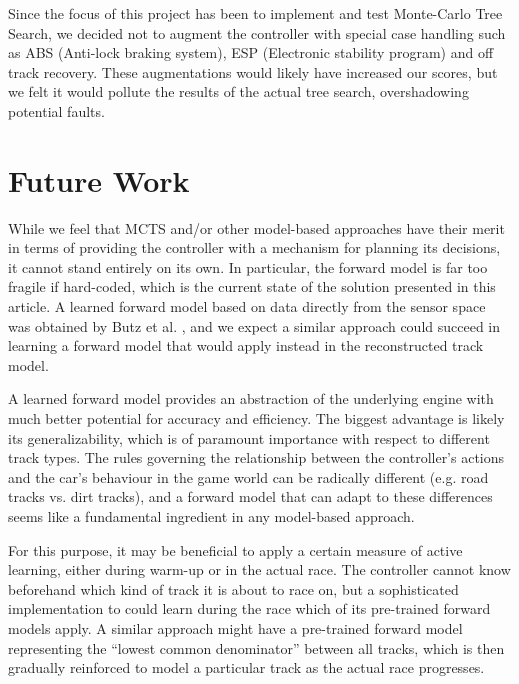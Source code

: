 \documentclass[conference]{IEEEtran}
\begin{document}
Since the focus of this project has been to implement and test Monte-Carlo Tree Search, we decided not to augment the controller with special case handling such as ABS (Anti-lock braking system), ESP (Electronic stability program) and off track recovery. These augmentations would likely have increased our scores, but we felt it would pollute the results of the actual tree search, overshadowing potential faults.

\section{Future Work}
\label{sec-futurework}
While we feel that MCTS and/or other model-based approaches have their merit in terms of providing the controller with a mechanism for planning its decisions, it cannot stand entirely on its own. In particular, the forward model is far too fragile if hard-coded, which is the current state of the solution presented in this article. A learned forward model based on data directly from the sensor space was obtained by Butz et al. \cite{cobostar}, and we expect a similar approach could succeed in learning a forward model that would apply instead in the reconstructed track model.

A learned forward model provides an abstraction of the underlying engine with much better potential for accuracy and efficiency. The biggest advantage is likely its generalizability, which is of paramount importance with respect to different track types. The rules governing the relationship between the controller’s actions and the car’s behaviour in the game world can be radically different (e.g. road tracks vs. dirt tracks), and a forward model that can adapt to these differences seems like a fundamental ingredient in any model-based approach.

For this purpose, it may be beneficial to apply a certain measure of active learning, either during warm-up or in the actual race. The controller cannot know beforehand which kind of track it is about to race on, but a sophisticated implementation to could learn during the race which of its pre-trained forward models apply. A similar approach might have a pre-trained forward model representing the “lowest common denominator” between all tracks, which is then gradually reinforced to model a particular track as the actual race progresses.
\end{document}
